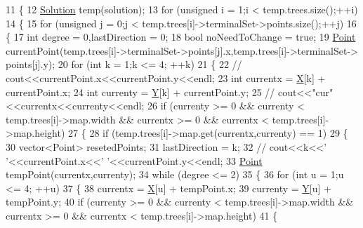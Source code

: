 \begin{DoxyCode}
11 \{
12     \hyperlink{classSolution}{Solution} temp(solution);
13     \textcolor{keywordflow}{for} (\textcolor{keywordtype}{unsigned} i = 1;i < temp.trees.size();++i)
14     \{
15         \textcolor{keywordflow}{for} (\textcolor{keywordtype}{unsigned} j = 0;j < temp.trees[i]->terminalSet->points.size();++j)
16         \{
17             \textcolor{keywordtype}{int} degree = 0,lastDirection = 0;
18             \textcolor{keywordtype}{bool} noNeedToChange = \textcolor{keyword}{true};
19             \hyperlink{classPoint}{Point} currentPoint(temp.trees[i]->terminalSet->points[j].x,temp.trees[i]->terminalSet->
      points[j].y);
20             \textcolor{keywordflow}{for} (\textcolor{keywordtype}{int} k = 1;k <= 4; ++k)
21             \{
22                 \textcolor{comment}{// cout<<currentPoint.x<<currentPoint.y<<endl;  }
23                 \textcolor{keywordtype}{int} currentx = \hyperlink{CleverOptimizie_8cpp_a34adaf40bb2f109e151ba28ccc73c677}{X}[k] + currentPoint.x;
24                 \textcolor{keywordtype}{int} currenty = \hyperlink{CleverOptimizie_8cpp_a86f15c23d2ab23bfebe784c368885663}{Y}[k] + currentPoint.y;
25                 \textcolor{comment}{// cout<<"cur"<<currentx<<currenty<<endl;}
26                 \textcolor{keywordflow}{if} (currenty >= 0 && currenty < temp.trees[i]->map.width && currentx >= 0 && currentx < 
      temp.trees[i]->map.height)
27                 \{
28                     \textcolor{keywordflow}{if} (temp.trees[i]->map.get(currentx,currenty) == 1) 
29                     \{
30                         vector<Point>  resetedPoints;
31                         lastDirection = k;
32                         \textcolor{comment}{// cout<<k<<' '<<currentPoint.x<<' '<<currentPoint.y<<endl;}
33                         \hyperlink{classPoint}{Point} tempPoint(currentx,currenty);
34                         \textcolor{keywordflow}{while} (degree <= 2)
35                         \{
36                             \textcolor{keywordflow}{for} (\textcolor{keywordtype}{int} u = 1;u <= 4; ++u)
37                             \{
38                                 currentx = \hyperlink{CleverOptimizie_8cpp_a34adaf40bb2f109e151ba28ccc73c677}{X}[u] + tempPoint.x;
39                                 currenty = \hyperlink{CleverOptimizie_8cpp_a86f15c23d2ab23bfebe784c368885663}{Y}[u] + tempPoint.y;
40                                 \textcolor{keywordflow}{if} (currenty >= 0 && currenty < temp.trees[i]->map.width && currentx >= 0 
      && currentx < temp.trees[i]->map.height)
41                                 \{

\end{DoxyCode}
